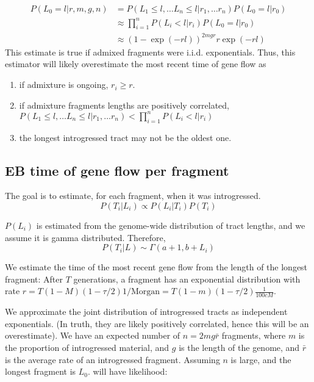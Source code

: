 \documentclass[10pt,a4paper]{article}
\begin{document}
\begin{align}
P(L_0=l | r, m, g, n) 
&= P(L_1 \leq l, \dots L_n \leq l | r_1, \dots r_n) P(L_0 = l | r_0)\nonumber\\
 &\approx \prod_{i=1}^n P(L_i < l| r_i) P(L_0 = l | r_0)\nonumber\\
&\approx (1- \exp( -r l ))^{2m g r} r \exp ( -r l)
\end{align}
This estimate is true if admixed fragments were i.i.d. exponentials. Thus, this estimator will likely overestimate the most recent time of gene flow as
\begin{enumerate}
	\item if admixture is ongoing, $r_i \geq r$.
	\item if admixture fragments lengths are positively correlated, $P(L_1 \leq l, \dots L_n \leq l | r_1, \dots r_n) < \prod_{i=1}^n P(L_i < l| r_i)$
	\item the longest introgressed tract may not be the oldest one.
\end{enumerate}

\subsection{EB time of gene flow per fragment}
The goal is to estimate, for each fragment, when it was introgressed.
$$P(T_i | L_i) \propto P(L_i | T_i) P(T_i) $$

$P(L_i)$ is estimated from the genome-wide distribution of tract lengths, and we assume it is gamma distributed. Therefore,
\begin{equation}
P(T_i | L) \sim \Gamma(a+1, b+L_i)
\end{equation}

We estimate the time of the most recent gene flow from the length of the longest fragment:
After $T$ generations, a fragment has an exponential distribution with rate $r=T(1-M)(1-\tau/2) 1/\text{Morgan} = T(1-m) (1-\tau/2)\frac{1}{100 cM}$.

We approximate the joint distribution of introgressed tracts as independent exponentials. (In truth, they are likely positively correlated, hence this will be an overestimate). We have an expected number of $n=2mg\bar{r}$ fragments, where $m$ is the proportion of introgressed material, and $g$ is the length of the genome, and $\bar{r}$ is the average rate of an introgressed fragment. Assuming $n$ is large, and the longest fragment is $L_0$. will have likelihood:  
\end{document}
